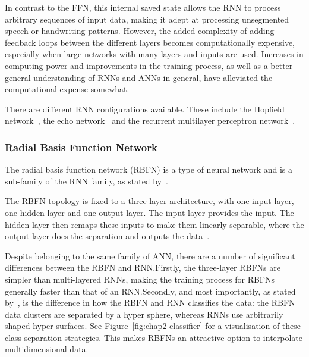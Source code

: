 In contrast to the FFN, this internal saved state allows the RNN to process arbitrary sequences of input data, making it adept at processing unsegmented speech or handwriting patterns. However, the added complexity of adding feedback loops between the different layers becomes computationally expensive, especially when large networks with many layers and inputs are used. Increases in computing power and improvements in the training process, as well as a better general understanding of RNNs and ANNs in general, have alleviated the computational expense somewhat.

There are different RNN configurations available. These include the Hopfield network~\citep{hopfield1982neural}, the echo network~\citep{jaeger2001echo} and the recurrent multilayer perceptron network~\citep{tutschku1995recurrent}.

\subsubsection{Radial Basis Function Network}

The radial basis function network (RBFN) is a type of neural network and is a sub-family of the RNN family, as stated by~\cite{wilamowski1996implementation}. 

The RBFN topology is fixed to a three-layer architecture, with one input layer, one hidden layer and one output layer. The input layer provides the input. The hidden layer then remaps these inputs to make them linearly separable, where the output layer does the separation and outputs the data~\citep{xie2011comparison}.  

Despite belonging to the same family of ANN, there are a number of significant differences between the RBFN and RNN.\@ Firstly, the three-layer RBFNs are simpler than multi-layered RNNs, making the training process for RBFNs generally faster than that of an RNN.\@ Secondly, and most importantly, as stated by~\citeauthor{xie2011comparison}, is the difference in how the RBFN and RNN classifies the data: the RBFN data clusters are separated by a hyper sphere, whereas RNNs use arbitrarily shaped hyper surfaces. See Figure~\ref{fig:chap2-classifier} for a visualisation of these class separation strategies. This makes RBFNs an attractive option to interpolate multidimensional data.

